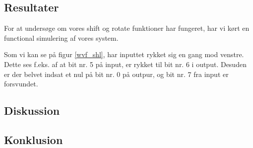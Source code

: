 \documentclass[../journal2.tex]{subfiles}
\begin{document}
\begin{table}[H]
    \centering
      \framebox{
        \rule{8pt}{0pt}
          
  }
  \caption{Architecture af shift\textunderscore div}
  \label{src:shift_div2}
\end{table}


\subsection{Resultater}

For at undersøge om vores shift og rotate funktioner har fungeret, har vi kørt en functional simulering af vores system. \par
Som vi kan se på figur \ref{wvf_shl}, har inputtet rykket sig en gang mod venstre. Dette ses f.eks. af at bit nr. 5 på input, er rykket til bit nr. 6 i output. Desuden er der belvet indsat et nul på bit nr. 0 på outpur, og bit nr. 7 fra input er forsvundet.


\subsection{Diskussion}

\subsection{Konklusion}
\end{document}
